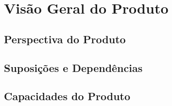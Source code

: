 \chapter{Visão Geral do Produto}

\section{Perspectiva do Produto}
\section{Suposições e Dependências}
\section{Capacidades do Produto}